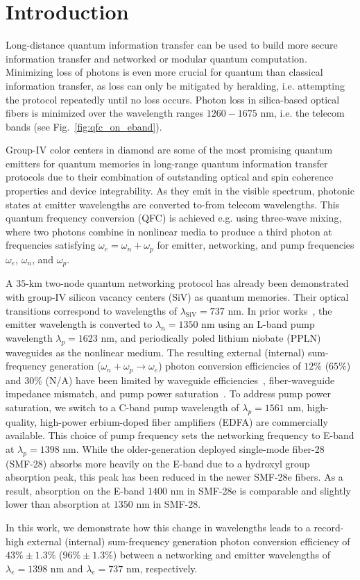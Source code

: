 \documentclass[floatfix,reprint,superscriptaddress,amsmath,amssymb,aps]{revtex4-2}
\begin{document}
\section{Introduction}
Long-distance quantum information transfer can be used to build more secure information transfer and networked or modular quantum computation. Minimizing loss of photons is even more crucial for quantum than classical information transfer, as loss can only be mitigated by heralding, i.e. attempting the protocol repeatedly until no loss occurs. Photon loss in silica-based optical fibers is minimized over the wavelength ranges $1260 - 1675$ nm, i.e. the telecom bands (see Fig.~\ref{fig:qfc_on_eband}). 
\par
Group-IV color centers in diamond are some of the most promising quantum emitters for quantum memories in long-range quantum information transfer protocols due to their combination of outstanding optical and spin coherence properties and device integrability. As they emit in the visible spectrum, photonic states at emitter wavelengths are converted to-from telecom wavelengths. This quantum frequency conversion (QFC) is achieved e.g. using three-wave mixing, where two photons combine in nonlinear media to produce a third photon at frequencies satisfying $\omega_{e} = \omega_{n} + \omega_{p}$ for emitter, networking, and pump frequencies $\omega_{e}$, $\omega_{n}$, and $\omega_{p}$. 
\par

A $35$-km two-node quantum networking protocol has already been demonstrated with group-IV silicon vacancy centers (SiV) as quantum memories. Their optical transitions correspond to wavelengths of $\lambda_{\mathrm{SiV}} = 737$ nm. In prior works~\cite{knaut2024entanglement,bersin2024telecom}, the emitter wavelength is converted to $\lambda_{n} = 1350$ nm using an L-band pump wavelength $\lambda_{p} = 1623$ nm, and periodically poled lithium niobate (PPLN) waveguides as the nonlinear medium. The resulting external (internal) sum-frequency generation ($\omega_{n} + \omega_{p} \to \omega_{e}$) photon conversion efficiencies of $12 \%$ ($65 \%$) and $30 \%$ (N/A) have been limited by waveguide efficiencies~\cite{bersin2024telecom},  fiber-waveguide impedance mismatch, and pump power saturation~\cite{knaut2024entanglement}. 
To address pump power saturation, we switch to a C-band pump wavelength of $\lambda_{p} = 1561$ nm, high-quality, high-power erbium-doped fiber amplifiers (EDFA) are commercially available. This choice of pump frequency sets the networking frequency to E-band at $\lambda_{p} = 1398$ nm. While the older-generation deployed single-mode fiber-28 (SMF-28) absorbs more heavily on the E-band due to a hydroxyl group absorption peak, this peak has been reduced in the newer SMF-28e fibers. As a result, absorption on the E-band $1400$ nm in SMF-28e is comparable and slightly lower than absorption at $1350$ nm in SMF-28. 
\par
In this work, we demonstrate how this change in wavelengths leads to a record-high external (internal) sum-frequency generation photon conversion efficiency of $43 \% \pm 1.3 \%$ ($96 \% \pm 1.3 \%$) between a networking and emitter wavelengths of $\lambda_{e} = 1398$ nm and $\lambda_{e} = 737$ nm, respectively.
\end{document}
